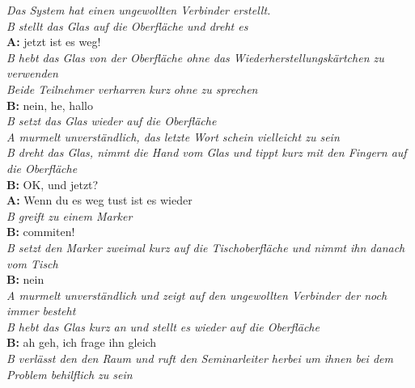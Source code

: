 \begin{transkript}
\emph{Das System hat einen ungewollten Verbinder erstellt.} \\
\emph{B stellt das Glas auf die Oberfläche und dreht es} \\
\textbf{A:} jetzt ist es weg! \\
\emph{B hebt das Glas von der Oberfläche ohne das Wiederherstellungskärtchen zu verwenden} \\
\emph{Beide Teilnehmer verharren kurz ohne zu sprechen} \\
\textbf{B:} nein, he, hallo \\
\emph{B setzt das Glas wieder auf die Oberfläche} \\
\emph{A murmelt unverständlich, das letzte Wort schein vielleicht zu sein} \\
\emph{B dreht das Glas, nimmt die Hand vom Glas und tippt kurz mit den Fingern auf die Oberfläche} \\
\textbf{B:} OK, und jetzt? \\
\textbf{A:} Wenn du es weg tust ist es wieder \\
\emph{B greift zu einem Marker} \\
\textbf{B:} commiten! \\
\emph{B setzt den Marker zweimal kurz auf die Tischoberfläche und nimmt ihn danach vom Tisch} \\
\textbf{B:} nein \\
\emph{A murmelt unverständlich und zeigt auf den ungewollten Verbinder der noch immer besteht} \\
\emph{B hebt das Glas kurz an und stellt es wieder auf die Oberfläche} \\
\textbf{B:} ah geh, ich frage ihn gleich \\
\emph{B verlässt den den Raum und ruft den Seminarleiter herbei um ihnen bei dem Problem behilflich zu sein} \\
\end{transkript}


